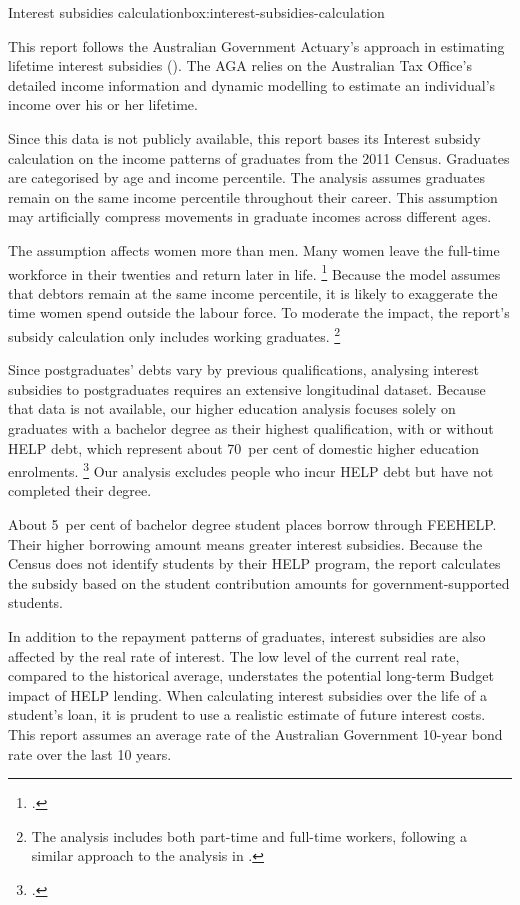 \documentclass[embargoed]{grattan}
\begin{document}
\begin{bigbox*}{Interest subsidies calculation}{box:interest-subsidies-calculation}

This report follows the Australian Government Actuary's approach in estimating lifetime interest subsidies ().
The \gls{AGA} relies on the Australian Tax Office's detailed income information and dynamic modelling to estimate an individual's income over his or her lifetime. 

Since this data is not publicly available, this report bases its \gls{Interest subsidy} calculation on the income patterns of graduates from the 2011 Census.
Graduates are categorised by age and income percentile. The analysis assumes graduates remain on the same income percentile throughout their career.
This assumption may artificially compress movements in graduate incomes across different ages.

The assumption affects women more than men.
Many women leave the full-time workforce in their twenties and return later in life.%
\footcite[][Figure~9]{Norton2016HELPfuturefairer} Because the model assumes that debtors remain at the same income percentile, it is likely to exaggerate the time women spend outside the labour force.
To moderate the impact, the report's subsidy calculation only includes working graduates.%
\footnote{The analysis includes both part-time and full-time workers, following a similar approach to the analysis in \textcite[][7--8]{Chapman2014InquiryprovisionsHigher}.}

Since postgraduates’ debts vary by previous qualifications, analysing interest subsidies to postgraduates requires an extensive longitudinal dataset. Because that data is not available, our higher education analysis focuses solely on graduates with a bachelor degree as their highest qualification, with or without \gls{HELP} debt, which represent about 70~per cent of domestic higher education enrolments.%
\footnote{\textcite[][Table 2.6]{Education2016StudentsSelectedhigher}.} Our analysis excludes people who incur \gls{HELP} debt but have not completed their degree.

About 5~per cent of bachelor degree student places borrow through \gls{FEEHELP}\@.
Their higher borrowing amount means greater interest subsidies. Because the Census does not identify students by their \gls{HELP} program, the report calculates the subsidy based on the student contribution amounts for government-supported students.

In addition to the repayment patterns of graduates, interest subsidies are also affected by the real rate of interest.
The low level of the current real rate, compared to the historical average, understates the potential long-term Budget impact of \gls{HELP} lending.
When calculating interest subsidies over the life of a student's loan, it is prudent to use a realistic estimate of future interest costs.
This report assumes an average rate of the Australian Government 10-year bond rate over the last 10 years.
\end{bigbox*}
\end{document}
